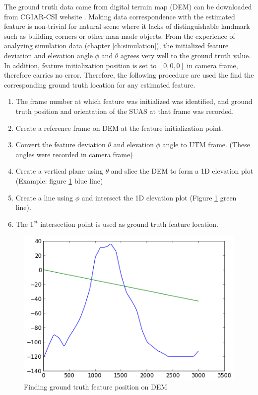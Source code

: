 The ground truth data came from digital terrain map (DEM) can be
downloaded from CGIAR-CSI website \cite{_cgiar-csi_????}. Making data
correspondence with the estimated feature is non-trivial for natural
scene where it lacks of distinguishable landmark such as building corners or
other man-made objects. From the experience of analyzing simulation
data (chapter \ref{ch:simulation}), the initialized feature deviation
and elevation angle $\phi$ and $\theta$ agrees very well to the ground
truth value. In addition, feature initialization position is set to
$[0, 0, 0]$ in camera frame, therefore carries no error. Therefore, the
following procedure are used the find the corresponding ground truth
location for any estimated feature.

\begin{enumerate}
  \item The frame number at which feature was initialized was
  identified, and ground truth position and orientation of the SUAS at
  that frame was recorded.
  \item Create a reference frame on DEM at the feature initialization point.
  \item Convert the feature deviation $\theta$ and elevation $\phi$
  angle to UTM frame. (These angles were recorded in camera frame)
  \item Create a vertical plane using $\theta$ and slice the DEM to
  form a 1D elevation plot (Example: figure \ref{fltfig:7} blue line)
  \item Create a line using $\phi$ and intersect the 1D elevation plot
  (Figure \ref{fltfig:7} green line). 
  \item The $1^{st}$ intersection point is used as ground truth
  feature location.
\end{enumerate}

\begin{figure}[h]
\centering
\includegraphics[width=12cm, keepaspectratio=true]
{./Figures/fltfig/cut1/intersect0_0.png}
\caption{Finding ground truth feature position on DEM}
\label{fltfig:7}
\end{figure}

